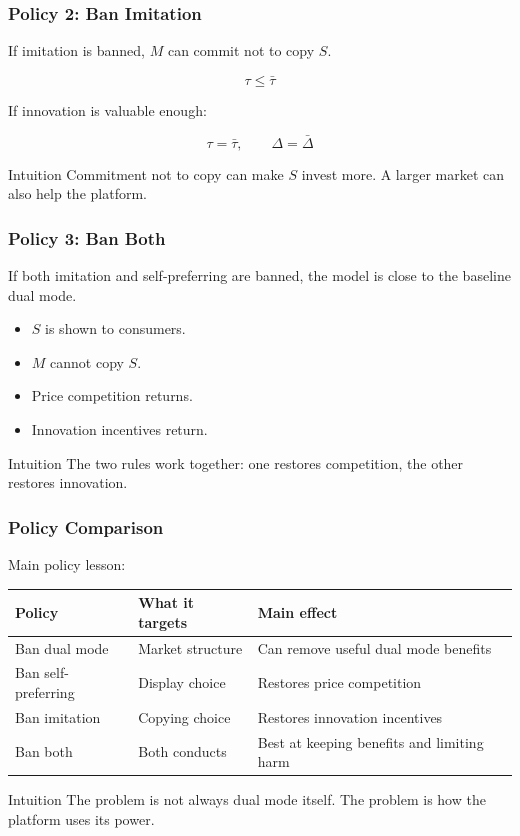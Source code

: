 \documentclass[aspectratio=169,AutoFakeBold,AutoFakeSlant]{beamer}
\begin{document}
\begin{frame}
  \frametitle{Policy 2: Ban Imitation}
  \small
  If imitation is banned, $M$ can commit not to copy $S$.

  \begin{equation*}
    \tau\leq\bar{\tau}
  \end{equation*}

  If innovation is valuable enough:

  \begin{equation*}
    \tau=\bar{\tau}, \qquad \Delta=\bar{\Delta}
  \end{equation*}

  \begin{block}{Intuition}
    Commitment not to copy can make $S$ invest more. A larger market can also help the platform.
  \end{block}
\end{frame}

\begin{frame}
  \frametitle{Policy 3: Ban Both}
  \small
  If both imitation and self-preferring are banned, the model is close to the baseline dual mode.

  \begin{itemize}
    \item $S$ is shown to consumers.
    \item $M$ cannot copy $S$.
    \item Price competition returns.
    \item Innovation incentives return.
  \end{itemize}

  \begin{alertblock}{Intuition}
    The two rules work together: one restores competition, the other restores innovation.
  \end{alertblock}
\end{frame}

\begin{frame}
  \frametitle{Policy Comparison}
  \small
  Main policy lesson:

  \begin{center}
    \begin{tabular}{lll}
      \toprule
      Policy & What it targets & Main effect \\
      \midrule
      Ban dual mode & Market structure & Can remove useful dual mode benefits \\
      Ban self-preferring & Display choice & Restores price competition \\
      Ban imitation & Copying choice & Restores innovation incentives \\
      Ban both & Both conducts & Best at keeping benefits and limiting harm \\
      \bottomrule
    \end{tabular}
  \end{center}

  \begin{block}{Intuition}
    The problem is not always dual mode itself. The problem is how the platform uses its power.
  \end{block}
\end{frame}
\end{document}
